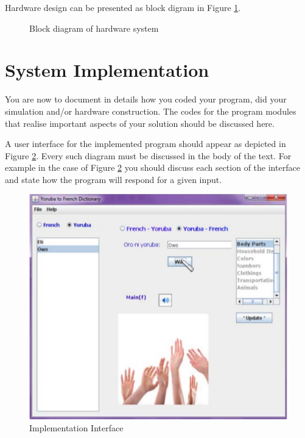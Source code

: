Hardware design can be presented as block digram in Figure \ref{BlokDiag}. 

\begin{figure}[!h]
	\centering
	\caption{Block diagram of hardware system}
	\label{BlokDiag}
\end{figure}

\section{System Implementation} You are now to document in details how you coded your program, did your simulation and/or hardware construction. The codes for the program modules that realise important aspects of your solution should be discussed here.

A user interface for the implemented program should appear as depicted in Figure \ref{dict2l}. Every such diagram must be discussed in the body of the text. For example in the case of Figure \ref{dict2l} you should discuss each section of the interface and state how the program will respond for a given input.

\begin{figure}[!h]
\centering
	\includegraphics[scale=0.8]{dict2}
	\caption{Implementation Interface}
	\label{dict2l}
\end{figure}


